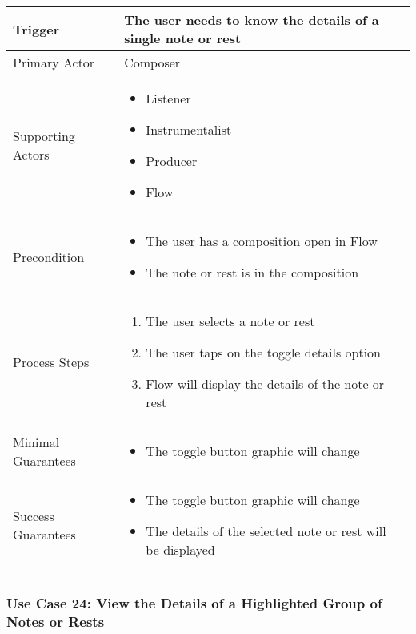   \begin{tabularx}{\textwidth}{|X|X|}
  \hline
  Trigger & 
  The user needs to know the details of a single note or rest\\
  \hline
  Primary Actor & 
  Composer \\
  \hline
  Supporting Actors & 
  \begin{itemize}
  \item Listener
  \item Instrumentalist
  \item Producer
  \item Flow
  \end{itemize} \\
  \hline
  Precondition & 
  \begin{itemize}
  \item The user has a composition open in Flow
  \item The note or rest is in the composition
  \end{itemize} \\
  \hline
  Process Steps & 
  \begin{enumerate}
  \item The user selects a note or rest
  \item The user taps on the toggle details option
  \item Flow will display the details of the note or rest
  \end{enumerate} \\
  \hline
  Minimal Guarantees & 
  \begin{itemize}
    \item The toggle button graphic will change
  \end{itemize} \\
  \hline
  Success Guarantees & 
  \begin{itemize}
    \item The toggle button graphic will change
    \item The details of the selected note or rest will be displayed 
  \end{itemize} \\
  \hline
  \end{tabularx}


  \subsubsection{Use Case 24: View the Details of a Highlighted Group of Notes or Rests}


